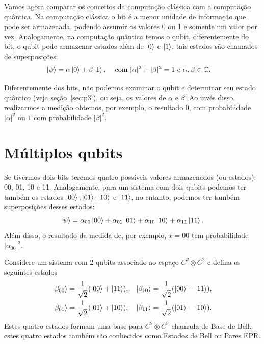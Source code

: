 Vamos agora comparar os conceitos da computação clássica com a computação quântica. Na computação clássica o bit é a menor unidade de informação que pode ser armazenada, podendo assumir os valores 0 ou 1 e somente um valor por vez. Analogamente, na computação quântica temos o qubit, diferentemente do bit, o qubit pode armazenar estados além de $\ket{0}$ e $\ket{1}$, tais estados são chamados de superposições:
%
\begin{align}
    \ket{\psi} &= \alpha \ket{0} + \beta\ket{1}, && \text{ com } |\alpha|^2+|\beta|^2 = 1 \text{ e } \alpha, \beta\in \mathbb{C}.
\end{align}

Diferentemente dos bits, não podemos examinar o qubit e determinar seu estado quântico (veja seção~\ref{sec:p3}), ou seja, os valores de $\alpha$ e $\beta$. Ao invés disso, realizarmos a medição obtemos, por exemplo, o resultado $0$, com probabilidade $|\alpha|^2$ ou $1$ com probabilidade $|\beta|^2$.

\section{Múltiplos qubits}

Se tivermos dois bits teremos quatro possíveis valores armazenados (ou estados): 00, 01, 10 e 11. Analogamente, para um sistema com dois qubits podemos ter também os estados $\ket{00}, \ket{01}, \ket{10}$ e $\ket{11}$, no entanto, podemos ter também superposições desses estados:
%
\begin{equation}
    \ket{\psi} = \alpha_{00}\ket{00} + \alpha_{01}\ket{01} + \alpha_{10}\ket{10} + \alpha_{11}\ket{11}.
\end{equation}
%
Além disso, o resultado da medida de, por exemplo, $x=00$ tem probabilidade $|\alpha_{00}|^2$.

\begin{definition}\label{def:epr}
    Considere um sistema com 2 qubits associado ao espaço $C^2\otimes C^2$ e defina os seguintes estados
    \begin{equation}
        \begin{split}
            \ket{\beta_{00}} = \frac{1}{\sqrt{2}}(\ket{00} + \ket{11}), \quad \ket{\beta_{10}} = \frac{1}{\sqrt{2}}(\ket{00} - \ket{11}), \\
            \ket{\beta_{01}} = \frac{1}{\sqrt{2}}(\ket{01} + \ket{10}), \quad \ket{\beta_{11}} = \frac{1}{\sqrt{2}}(\ket{01} - \ket{10}).
        \end{split}
    \end{equation}
Estes quatro estados formam uma base para $C^2\otimes C^2$ chamada de Base de Bell, estes quatro estados também são conhecidos como Estados de Bell ou Pares EPR.
\end{definition}

